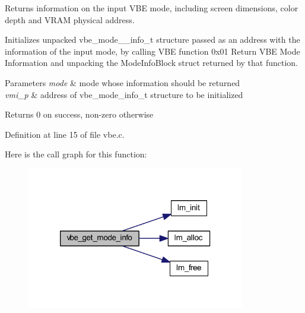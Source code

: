 Returns information on the input V\+B\+E mode, including screen dimensions, color depth and V\+R\+A\+M physical address. 

Initializes unpacked vbe\+\_\+mode\+\_\+\+\_\+info\+\_\+t structure passed as an address with the information of the input mode, by calling V\+B\+E function 0x01 Return V\+B\+E Mode Information and unpacking the Mode\+Info\+Block struct returned by that function.


\begin{DoxyParams}{Parameters}
{\em mode} & mode whose information should be returned \\
\hline
{\em vmi\+\_\+p} & address of vbe\+\_\+mode\+\_\+info\+\_\+t structure to be initialized \\
\hline
\end{DoxyParams}
\begin{DoxyReturn}{Returns}
0 on success, non-\/zero otherwise 
\end{DoxyReturn}


Definition at line 15 of file vbe.\+c.



Here is the call graph for this function\+:\nopagebreak
\begin{figure}[H]
\begin{center}
\leavevmode
\includegraphics[width=270pt]{group__vbe_ga4ef3234e41f2050bc094a22049b69e45_cgraph}
\end{center}
\end{figure}


